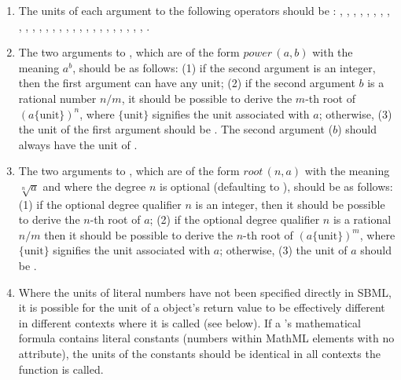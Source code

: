 \begin{enumerate}
\item The units of each argument to the following operators should
  be : , , ,
  , , , ,
  , , , ,
  , , , ,
  , , , ,
  , , , ,
  , , ,
  , .

\item The two arguments to , which are of the form
  $\textit{power}\,(a,b)$ with the meaning $a^b$, should be as
  follows: (1) if the second argument is an integer, then the
  first argument can have any unit; (2) if the second argument $b$
  is a rational number $n/m$, it should be possible to derive the
  $m$-th root of $(a \{\text{unit}\})^n$, where $\{\text{unit}\}$
  signifies the unit associated with $a$; otherwise, (3) the unit
  of the first argument should be .  The second
  argument ($b$) should always have the unit of .

\item The two arguments to , which are of the form
  $\textit{root}\,(n,a)$ with the meaning $\sqrt[n]{a}$ and where
  the degree $n$ is optional (defaulting to ), should be as
  follows: (1) if the optional degree qualifier $n$ is an integer,
  then it should be possible to derive the $n$-th root of $a$; (2)
  if the optional degree qualifier $n$ is a rational $n/m$ then it
  should be possible to derive the $n$-th root of $(a
  \{\text{unit}\})^m$, where $\{\text{unit}\}$ signifies the unit
  associated with $a$; otherwise, (3) the unit of $a$ should be
  .

\item Where the units of literal numbers have not been specified
  directly in SBML, it is possible for the unit of a
  \FunctionDefinition object's return value to be effectively
  different in different contexts where it is called (see below).
  If a \FunctionDefinition's mathematical formula contains literal
  constants (\ie numbers within MathML  elements with no
   attribute), the units of the constants should
  be identical in all contexts the function is called.

\end{enumerate}

